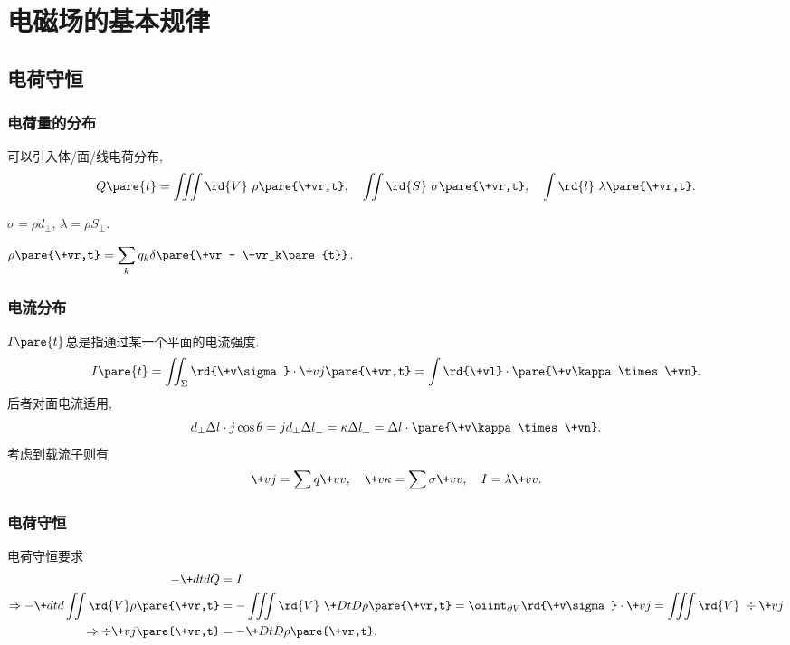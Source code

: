 \documentclass[hidelinks]{ctexart}
\begin{document}
\section{电磁场的基本规律} %
\label{sec:电磁场的基本规律}

\subsection{电荷守恒} %
\label{sub:电荷守恒}

\subsubsection{电荷量的分布} %
\label{ssub:电荷量的分布}

可以引入体/面/线电荷分布,
\[ Q\pare{t} = \iiint\rd{V}\ \rho\pare{\+vr,t},\quad \iint \rd{S}\ \sigma\pare{\+vr,t},\quad \int \rd{l}\ \lambda\pare{\+vr,t}. \]
\begin{cenum}
    \item $\sigma = \rho d_\perp$, $\lambda = \rho S_\perp$.
    \item $\displaystyle \rho\pare{\+vr,t} = \sum_k q_k \delta\pare{\+vr - \+vr_k\pare{t}}$.
\end{cenum}


\subsubsection{电流分布} %
\label{ssub:电流分布}

$I\pare{t}$总是指通过某一个平面的电流强度.
\[ I\pare{t} = \iint_\Sigma \rd{\+v\sigma}\cdot \+vj\pare{\+vr,t} = \int \rd{\+vl} \cdot \pare{\+v\kappa\times \+vn}. \]
后者对面电流适用,
\[ d_\perp \Delta l \cdot j\cos\theta = j d_\perp \Delta l_\perp = \kappa \Delta l_\perp = \Delta l \cdot \pare{\+v\kappa \times \+vn}. \]
考虑到载流子则有
\[ \+vj = \sum q \+vv,\quad \+v\kappa = \sum \sigma \+vv,\quad I = \lambda \+vv. \]


\subsubsection{电荷守恒} %
\label{ssub:电荷守恒}

电荷守恒要求
\begin{align*}
    -\+dtdQ &= I \\ \Rightarrow-\+dtd{}\iint\rd{V}\rho\pare{\+vr,t} &= -\iiint\rd{V}\ \+DtD{}\rho\pare{\+vr,t} = \oiint_{\partial V}\rd{\+v\sigma} \cdot \+vj = \iiint\rd{V}\ \div \+vj \\
    \Rightarrow \div \+vj\pare{\+vr,t} &= -\+DtD{}\rho\pare{\+vr,t}.
\end{align*}
\end{document}
